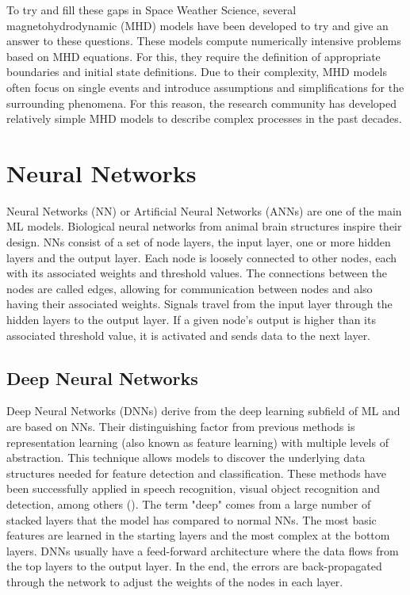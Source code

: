 To try and fill these gaps in Space Weather Science, several magnetohydrodynamic (MHD) models have been developed to try and give an answer to these questions. These models compute numerically intensive problems based on MHD equations. For this, they require the definition of appropriate boundaries and initial state definitions. Due to their complexity, MHD models often focus on single events and introduce assumptions and simplifications for the surrounding phenomena. For this reason, the research community has developed relatively simple MHD models to describe complex processes in the past decades.

\section{Neural Networks}\label{sec:nn}
Neural Networks (NN) or Artificial Neural Networks (ANNs) are one of the main ML models. Biological neural networks from animal brain structures inspire their design. NNs consist of a set of node layers, the input layer, one or more hidden layers and the output layer. Each node is loosely connected to other nodes, each with its associated weights and threshold values. The connections between the nodes are called edges, allowing for communication between nodes and also having their associated weights. Signals travel from the input layer through the hidden layers to the output layer. If a given node's output is higher than its associated threshold value, it is activated and sends data to the next layer.

\subsection{Deep Neural Networks}\label{sec:deep_learning}
Deep Neural Networks (DNNs) derive from the  deep learning subfield of ML and are based on NNs. Their distinguishing factor from previous methods is representation learning (also known as feature learning) with multiple levels of abstraction. This technique allows models to discover the underlying data structures needed for feature detection and classification. These methods have been successfully applied in speech recognition, visual object recognition and detection, among others (\cite{lecun.etal_DeepLearning_2015}). The term "deep" comes from a large number of stacked layers that the model has compared to normal NNs. The most basic features are learned in the starting layers and the most complex at the bottom layers. DNNs usually have a feed-forward architecture where the data flows from the top layers to the output layer. In the end, the errors are back-propagated through the network to adjust the weights of the nodes in each layer.

